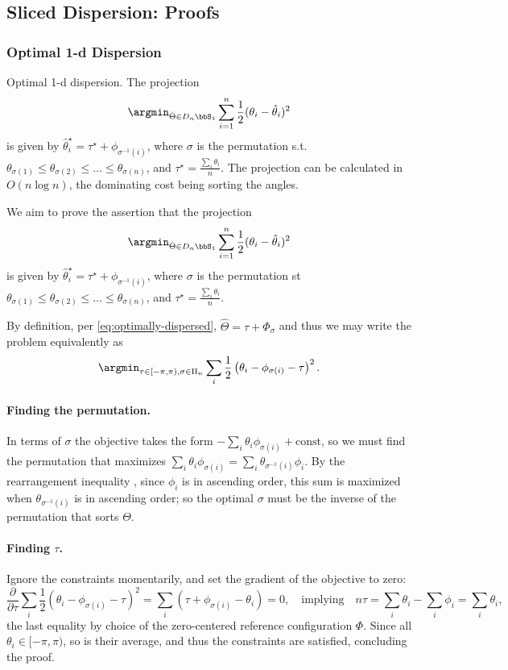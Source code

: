 \documentclass[10pt]{article} %
\begin{document}
\subsection{Sliced Dispersion: Proofs}\label{app:sliced-proofs}
\subsubsection{Optimal 1-d Dispersion}

\begin{lemma}{Optimal 1-d dispersion.}\label{lemma:dispersion}
The projection
\[ \argmin_{\hat\Theta \in D_n \bbS_1}
\sum_{i=1}^n \frac{1}{2}(\theta_i - \hat\theta_i)^2\]
is given by
\(\hat\theta^\star_i = \tau^\star + \phi_{\sigma^{-1}(i)}\),
where
\(\sigma\) is the permutation s.t. \(\theta_{\sigma(1)} \leq \theta_{\sigma(2)}
\leq\ldots \leq \theta_{\sigma(n)}\),
and \(\tau^\star = \frac{\sum_i \theta_i}{n}\).
The projection can be calculated in \(O(n \log n)\),
the dominating cost being sorting the angles.
\end{lemma}

We aim to prove the assertion that
the projection
\[ \argmin_{\hat\Theta \in D_n \bbS_1}
\sum_{i=1}^n \frac{1}{2}(\theta_i - \hat\theta_i)^2\]
is given by
\(\hat\theta^\star_i = \tau^\star + \phi_{\sigma^{-1}(i)}\),
where
\(\sigma\) is the permutation st \(\theta_{\sigma(1)} \leq \theta_{\sigma(2)}
\leq\ldots \leq \theta_{\sigma(n)}\),
and \(\tau^\star = \frac{\sum_i \theta_i}{n}\).

By definition, per \cref{eq:optimally-dispersed},
\(\hat\Theta = \tau + \Phi_\sigma\) and thus we may write the problem
equivalently as
\[
\argmin_{\tau \in [-\pi,\pi), \sigma \in \Pi_n}
\sum_i \frac{1}{2} \left(\theta_i - \phi_{\sigma(i)} - \tau\right)^2.
\]

\paragraph{Finding the permutation.}
 In terms of \(\sigma\) the objective takes the form \(-\sum_i
\theta_i \phi_{\sigma(i)} + \text{const}\),
so we must find the permutation that maximizes \(
\sum_i \theta_i \phi_{\sigma(i)} =
\sum_i \theta_{\sigma^{-1}(i)} \phi_i\).
By the
rearrangement inequality
\citep[Thms.~368--369]{hardy1952inequalities},
since \(\phi_i\) is in ascending order,
this sum is maximized when \(\theta_{\sigma^{-1}(i)}\) is in ascending order;
so the optimal \(\sigma\) must be the inverse of the permutation that sorts
\(\Theta\).

\paragraph{Finding \(\tau\).}
Ignore the constraints momentarily, and set the gradient of the objective to zero:
\[\frac{\partial}{\partial \tau}
\sum_i \frac{1}{2} ( \theta_i - \phi_{\sigma(i)} - \tau)^2
= \sum_i (\tau + \phi_{\sigma(i)} - \theta_i) = 0,
\quad\text{implying}\quad n\tau = \sum_i \theta_i - \sum_i \phi_i = \sum_i
\theta_i,
\]
the last equality by choice of the zero-centered reference configuration
\(\Phi\). Since all \(\theta_i \in [-\pi, \pi)\), so is their average, and thus
the constraints are satisfied, concluding the proof.
\end{document}
